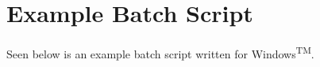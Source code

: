 \chapter{Example Batch Script}
\label{app:examplescript}
Seen below is an example batch script written for Windows\textsuperscript{TM}. 